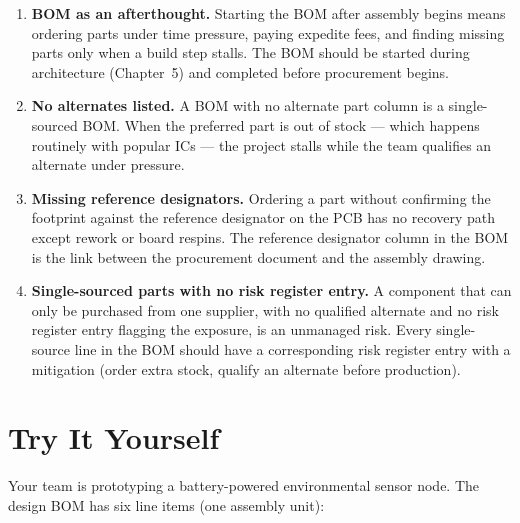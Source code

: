 \begin{enumerate}
  \item[(a)] \textbf{BOM as an afterthought.}
        Starting the BOM after assembly begins means ordering parts under time
        pressure, paying expedite fees, and finding missing parts only when
        a build step stalls.
        The BOM should be started during architecture (Chapter~5) and completed
        before procurement begins.

  \item[(b)] \textbf{No alternates listed.}
        A BOM with no alternate part column is a single-sourced BOM.
        When the preferred part is out of stock --- which happens routinely with
        popular ICs --- the project stalls while the team qualifies an alternate
        under pressure.

  \item[(c)] \textbf{Missing reference designators.}
        Ordering a part without confirming the footprint against the reference
        designator on the PCB has no recovery path except rework or board
        respins.
        The reference designator column in the BOM is the link between the
        procurement document and the assembly drawing.

  \item[(d)] \textbf{Single-sourced parts with no risk register entry.}
        A component that can only be purchased from one supplier, with no
        qualified alternate and no risk register entry flagging the exposure,
        is an unmanaged risk.
        Every single-source line in the BOM should have a corresponding risk
        register entry with a mitigation (order extra stock, qualify an
        alternate before production).
\end{enumerate}

\section*{Try It Yourself}
\label{sec:ch11-try}

Your team is prototyping a battery-powered environmental sensor node.
The design BOM has six line items (one assembly unit):

